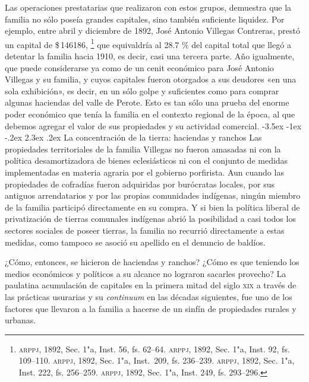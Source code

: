 \documentclass[14pt,twoside,final]{extbook} %
\makeatletter
\let\oldfootnote\footnote
\renewcommand\footnote[1]{%
\oldfootnote{\hspace{1mm}#1}}
\renewcommand\section{\@startsection {section}{1}{\z@}%
                                     {-3.5ex \@plus -1ex \@minus -.2ex}%
                                     {2.3ex \@plus .2ex}%
                                     {\normalfont\large\bfseries\sc}}
\makeatother
\begin{document}
Las operaciones prestatarias que realizaron con estos grupos, demuestra que la familia no sólo poseía grandes capitales, sino también suficiente liquidez. Por ejemplo, entre abril y diciembre de 1892, José Antonio Villegas Contreras, prestó un capital de \$\,146186,\footnote{\textsc{arppj}, 1892, Sec. 1"a, Inst. 56, fs. 62--64. \textsc{arppj}, 1892, Sec. 1"a, Inst. 92, fs. 109--110. \textsc{arppj}, 1892, Sec. 1"a, Inst.~209, fs. 236--239. \textsc{arppj}, 1892, Sec. 1"a, Inst. 222, fs. 256--259. \textsc{arppj}, 1892, Sec. 1"a, Inst. 249, fs. 293--296.} que equivaldría al 28.7 \% del capital total que llegó a detentar la familia hacia 1910, es decir, casi una tercera parte. Año igualmente, que puede considerarse ya como de un cenit económico para José Antonio Villegas y su familia, y cuyos capitales fueron otorgados a sus deudores «en una sola exhibición», es decir, en un sólo golpe y suficientes como para comprar algunas haciendas del valle de Perote. Esto es tan sólo una prueba del enorme poder económico que tenía la familia en el contexto regional de la época, al que debemos agregar el valor de sus propiedades y su actividad comercial.
\section{La concentración de la tierra: haciendas y ranchos}
\label{sec:concentracion-haciendas-y-ranchos}
Las propiedades territoriales de la familia Villegas no fueron amasadas ni con la política desamortizadora de bienes eclesiásticos ni con el conjunto de medidas implementadas en materia agraria por el gobierno porfirista. Aun cuando las propiedades de cofradías fueron adquiridas por burócratas locales, por sus antiguos arrendatarios y por las propias comunidades indígenas, ningún miembro de la familia participó directamente en su compra. Y si bien la política liberal de privatización de tierras comunales indígenas abrió la posibilidad a casi todos los sectores sociales de poseer tierras, la familia no recurrió directamente a estas medidas, como tampoco se asoció su apellido en el denuncio de baldíos.

¿Cómo, entonces, se hicieron de haciendas y ranchos? ¿Cómo es que teniendo los medios económicos y políticos a su alcance no lograron sacarles provecho? La paulatina acumulación de capitales en la primera mitad del siglo \textsc{xix} a través de las prácticas usurarias y su \emph{continuum} en las décadas siguientes, fue uno de los factores que llevaron a la familia a hacerse de un sinfín de propiedades rurales y urbanas.
\end{document}

